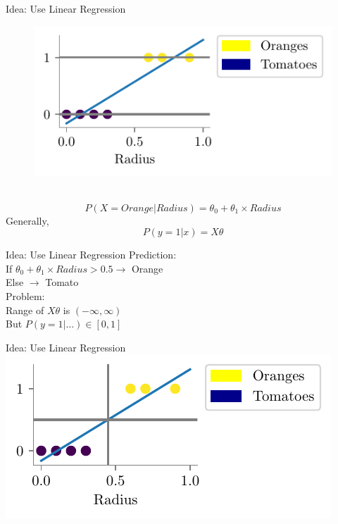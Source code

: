 \documentclass{beamer}
\begin{document}
\begin{frame}{Idea: Use Linear Regression}
\hspace{2.5cm}
\begin{minipage}{0.3\textwidth}
	
	\begin{figure}
		
		\includegraphics{../assets/logistic-regression/figures/linear-orange-tomatoes.pdf}
	\end{figure}
\end{minipage} \\
\begin{equation*}
P(X = Orange | Radius) = \theta_{0} + \theta_{1} \times Radius
\end{equation*}
\pause Generally,
\begin{equation*}
P(y = 1 | x) = X\theta
\end{equation*}
\end{frame}
\begin{frame}{Idea: Use Linear Regression}
Prediction:\\
If $\theta_{0} + \theta_{1}\times Radius > 0.5 \rightarrow$ Orange \\
\hspace{3.3cm} Else $\rightarrow$ Tomato\\
Problem:\\
Range of $X\theta$ is $(-\infty, \infty)$\\
But $P(y = 1 | \ldots) \in [0, 1]$
\end{frame}

\begin{frame}{Idea: Use Linear Regression}
\includegraphics{../assets/logistic-regression/figures/linear-orange-tomatoes-decision.pdf}
\end{frame}
\end{document}
